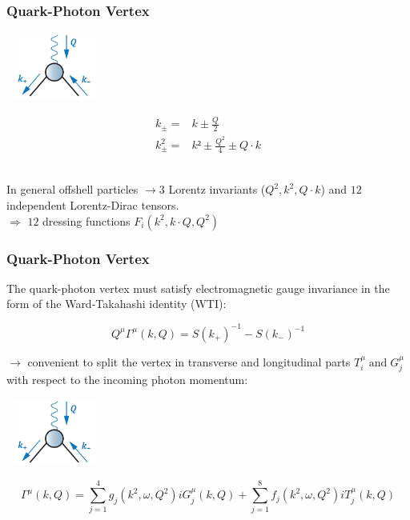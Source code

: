 \begin{frame}\frametitle{Quark-Photon Vertex}
\begin{minipage}[r]{0.49\textwidth}
	\hspace{2mm}	
	\includegraphics[height=2.2cm, width=3.2cm]{Vertex.png}
\end{minipage}
%
\begin{minipage}[r]{0.49\textwidth}
\begin{align}
k_{\pm} =& k \pm \frac{Q}{2} \\\nonumber
k_{\pm}^2=& k² \pm \frac{Q^2}{4} \pm Q\cdot k
\end{align}
\end{minipage}\\
%
\vspace{3mm}
%
In general offshell  particles $\rightarrow 3$ Lorentz invariants ($Q^2, k^2, Q\cdot k$) and $12$ independent Lorentz-Dirac tensors.\\
\vspace{3mm}
$\Rightarrow$ $12$ dressing functions $F_i(k^2, k\cdot Q, Q^2)$
\end{frame}

\begin{frame}\frametitle{Quark-Photon Vertex}
The quark-photon vertex must satisfy electromagnetic gauge invariance in the form of the
Ward-Takahashi identity (WTI):

\begin{equation}
	Q^\mu\Gamma^\mu(k, Q)=S(k_+)^{-1}-S(k_-)^{-1}
\end{equation}

\begin{minipage}[r]{0.65\textwidth}
	$\rightarrow$ convenient to split the vertex in transverse and longitudinal parts $T_i^{\mu} \; \text{and} \; G_j^{\mu} $ with respect to the incoming photon momentum:
\end{minipage}
\begin{minipage}[r]{0.30\textwidth}
	\hspace{2mm}	
	\includegraphics[height=2.2cm, width=3.2cm]{Vertex.png}
\end{minipage}


\begin{equation}
	\Gamma^\mu(k,Q)=\sum_{j=1}^4 g_j(k^2, \omega, Q^2)iG^\mu_j(k, Q)+\sum_{j=1}^8 f_j(k^2, \omega, Q^2)iT^\mu_j(k, Q)
\end{equation}


\end{frame}



